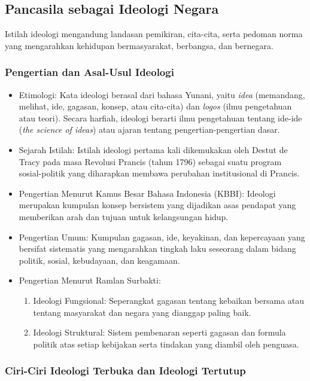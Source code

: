 \subsection{Pancasila sebagai Ideologi Negara}

Istilah ideologi mengandung landasan pemikiran, cita-cita, serta pedoman norma yang mengarahkan kehidupan bermasyarakat, berbangsa, dan bernegara.

\subsubsection{Pengertian dan Asal-Usul Ideologi}

\begin{itemize}
\item Etimologi: Kata ideologi berasal dari bahasa Yunani, yaitu \textit{idea} (memandang, melihat, ide, gagasan, konsep, atau cita-cita) dan \textit{logos} (ilmu pengetahuan atau teori). Secara harfiah, ideologi berarti ilmu pengetahuan tentang ide-ide (\textit{the science of ideas}) atau ajaran tentang pengertian-pengertian dasar.
\item Sejarah Istilah: Istilah ideologi pertama kali dikemukakan oleh Destut de Tracy pada masa Revolusi Prancis (tahun 1796) sebagai suatu program sosial-politik yang diharapkan membawa perubahan institusional di Prancis.
\item Pengertian Menurut Kamus Besar Bahasa Indonesia (KBBI): Ideologi merupakan kumpulan konsep bersistem yang dijadikan asas pendapat yang memberikan arah dan tujuan untuk kelangsungan hidup.
\item Pengertian Umum: Kumpulan gagasan, ide, keyakinan, dan kepercayaan yang bersifat sistematis yang mengarahkan tingkah laku seseorang dalam bidang politik, sosial, kebudayaan, dan keagamaan.
\item Pengertian Menurut Ramlan Surbakti:
  \begin{enumerate}
  \item Ideologi Fungsional: Seperangkat gagasan tentang kebaikan bersama atau tentang masyarakat dan negara yang dianggap paling baik.
  \item Ideologi Struktural: Sistem pembenaran seperti gagasan dan formula politik atas setiap kebijakan serta tindakan yang diambil oleh penguasa.
  \end{enumerate}
\end{itemize}

\subsubsection{Ciri-Ciri Ideologi Terbuka dan Ideologi Tertutup}

